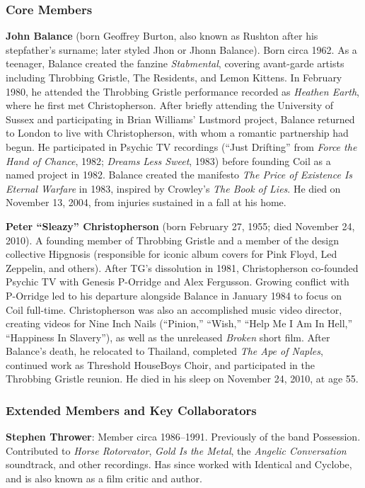 \documentclass[11pt,letterpaper]{article}
\begin{document}
\subsubsection{Core Members}

\textbf{John Balance} (born Geoffrey Burton, also known as Rushton after his stepfather's surname; later styled Jhon or Jhonn Balance). Born circa 1962. As a teenager, Balance created the fanzine \textit{Stabmental}, covering avant-garde artists including Throbbing Gristle, The Residents, and Lemon Kittens. In February 1980, he attended the Throbbing Gristle performance recorded as \textit{Heathen Earth}, where he first met Christopherson. After briefly attending the University of Sussex and participating in Brian Williams' Lustmord project, Balance returned to London to live with Christopherson, with whom a romantic partnership had begun. He participated in Psychic TV recordings (``Just Drifting'' from \textit{Force the Hand of Chance}, 1982; \textit{Dreams Less Sweet}, 1983) before founding Coil as a named project in 1982. Balance created the manifesto \textit{The Price of Existence Is Eternal Warfare} in 1983, inspired by Crowley's \textit{The Book of Lies}. He died on November 13, 2004, from injuries sustained in a fall at his home.

\textbf{Peter ``Sleazy'' Christopherson} (born February 27, 1955; died November 24, 2010). A founding member of Throbbing Gristle and a member of the design collective Hipgnosis (responsible for iconic album covers for Pink Floyd, Led Zeppelin, and others). After TG's dissolution in 1981, Christopherson co-founded Psychic TV with Genesis P-Orridge and Alex Fergusson. Growing conflict with P-Orridge led to his departure alongside Balance in January 1984 to focus on Coil full-time. Christopherson was also an accomplished music video director, creating videos for Nine Inch Nails (``Pinion,'' ``Wish,'' ``Help Me I Am In Hell,'' ``Happiness In Slavery''), as well as the unreleased \textit{Broken} short film. After Balance's death, he relocated to Thailand, completed \textit{The Ape of Naples}, continued work as Threshold HouseBoys Choir, and participated in the Throbbing Gristle reunion. He died in his sleep on November 24, 2010, at age 55.

\subsubsection{Extended Members and Key Collaborators}

\textbf{Stephen Thrower}: Member circa 1986--1991. Previously of the band Possession. Contributed to \textit{Horse Rotorvator}, \textit{Gold Is the Metal}, the \textit{Angelic Conversation} soundtrack, and other recordings. Has since worked with Identical and Cyclobe, and is also known as a film critic and author.
\end{document}
